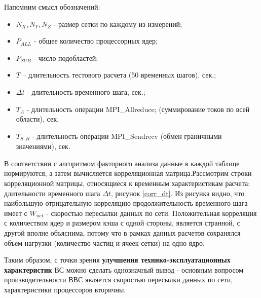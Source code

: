\begin{center}
\begin{table}[ht]
\begin{tabular}{|c|c|c|c|c|c|c|c|c|c|c|c|c|}
		\end{tabular}
		\label{modern_PIC_params_hard}
	\end{table}
	\end{center}
Напомним смысл обозначений:
\begin{itemize}
	\item $N_X, N_Y, N_Z$  - размер сетки по каждому из измерений;
	\item $P_{ALL}$  - общее количество процессорных ядер;
	\item $P_{SUB}$  - число подобластей;
	\item $T$ – длительность тестового расчета (50 временных шагов), сек.;
	\item $\Delta t$  - длительность временного шага, сек.;
	\item $T_{A}$ - длительность операции MPI\_Allreduce; (суммирование токов по всей области), сек.
	\item $T_{S,B}$ - длительность операции MPI\_Sendrecv (обмен граничными значениями), сек.
\end{itemize}

\clearpage

        В соответствии с алгоритмом факторного анализа данные в каждой таблице нормируются, а затем вычисляется корреляционная матрица.Рассмотрим строки корреляционной матрицы, относящиеся к временным характеристикам расчета: длительности временного шага $\Delta t$, рисунок \ref{corr_dt}. Из рисунка видно, что наибольшую отрицательную корреляцию продолжительность временного шага имеет с $W_{net}$ - скоростью пересылки данных по сети. Положительная корреляция с количеством ядер и размером кэша с одной стороны, является странной, с другой вполне объяснима, потому что в рамках данных расчетов сохранялся объем нагрузки (количество частиц и ячеек сетки) на одно ядро. 
        
        Таким образом, с точки зрения \textbf{улучшения технико-эксплуатационных характеристик} ВС можно сделать однозначный вывод - основным вопросом производительности ВВС является скоростью пересылки данных по сети, характеристики процессоров вторичны. 
        
